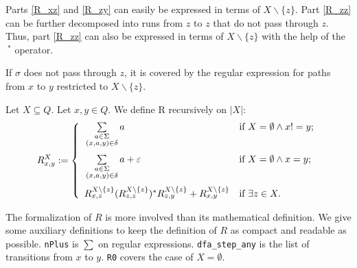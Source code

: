 Parts \ref{R_xz} and \ref{R_zy} can easily be expressed in terms of $X\backslash\{z\}$.
Part \ref{R_zz} can be further decomposed into runs from $z$ to $z$ that do not pass through $z$.
Thus, part \ref{R_zz} can also be expressed in terms of $X\backslash\{z\}$ with the help of the $\ ^*$ operator.

If $\sigma$ does not pass through $z$, it is covered by the regular expression for paths from $x$ to $y$ restricted to $X\backslash\{z\}$.


\begin{definition}
    \label{R}
    Let $X \subseteq Q$. Let $x, y \in Q$.
    We define R recursively on $|X|$:
    \begin{equation*}
        R^X_{x,y} := \left\{  
                \begin{array}{ll}
                    \vphantom{ \sum\limits_{ \substack{ a \in \Sigma\\ (x,a,y) \in \delta \\ b \in \Sigma } } }
                    \sum\limits_{
                        \substack{
                            a \in \Sigma\\
                            (x,a,y) \in \delta
                        }
                    } a 
                    & \mbox{if } X = \emptyset \wedge x != y; \\
                    \vphantom{ \sum\limits_{ \substack{ a \in \Sigma\\ (x,a,y) \in \delta \\ b \in \Sigma } } }
                    \sum\limits_{
                        \substack{
                            a \in \Sigma\\
                            (x,a,y) \in \delta
                        }
                    } a + \varepsilon 
                    & \mbox{if } X = \emptyset \wedge x = y; \\
                     R^{X\backslash\{z\}}_{x,z} (R^{X\backslash\{z\}}_{z,z})^* R^{X\backslash\{z\}}_{z,y} + R^{X\backslash\{z\}}_{x,y}
                     & \mbox{if } \exists z \in X.
                \end{array}
            \right.
    \end{equation*}
\end{definition}

The formalization of $R$ is more involved than its mathematical definition. 
We give some auxiliary definitions to keep the definition of $R$ as compact and readable as possible.
\lstinline{nPlus} is $\sum$ on regular expressions.
\lstinline{dfa_step_any} is the list of transitions from $x$ to $y$.
\lstinline{R0} covers the case of $X=\emptyset$.

